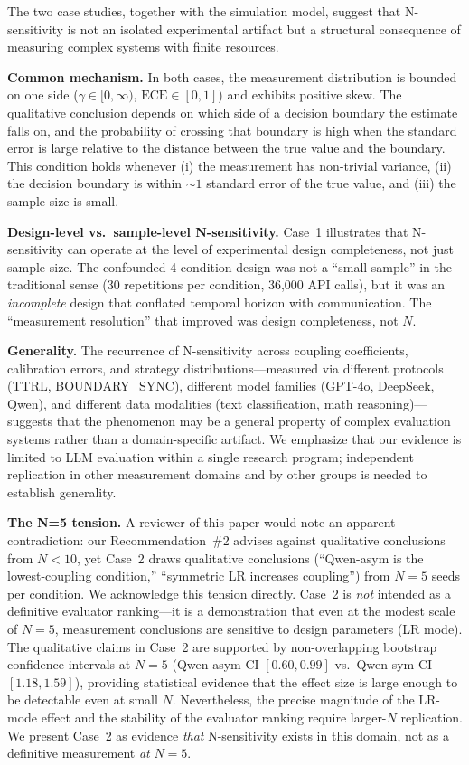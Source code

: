 \documentclass[11pt]{article}
\begin{document}
The two case studies, together with the simulation model, suggest that N-sensitivity is not an isolated experimental artifact but a structural consequence of measuring complex systems with finite resources.

\textbf{Common mechanism.} In both cases, the measurement distribution is bounded on one side ($\gamma \in [0, \infty)$, $\text{ECE} \in [0, 1]$) and exhibits positive skew. The qualitative conclusion depends on which side of a decision boundary the estimate falls on, and the probability of crossing that boundary is high when the standard error is large relative to the distance between the true value and the boundary. This condition holds whenever (i) the measurement has non-trivial variance, (ii) the decision boundary is within $\sim 1$ standard error of the true value, and (iii) the sample size is small.

\textbf{Design-level vs.\ sample-level N-sensitivity.} Case~1 illustrates that N-sensitivity can operate at the level of experimental design completeness, not just sample size. The confounded 4-condition design was not a ``small sample'' in the traditional sense (30 repetitions per condition, 36,000 API calls), but it was an \emph{incomplete} design that conflated temporal horizon with communication. The ``measurement resolution'' that improved was design completeness, not $N$.

\textbf{Generality.} The recurrence of N-sensitivity across coupling coefficients, calibration errors, and strategy distributions---measured via different protocols (TTRL, BOUNDARY\_SYNC), different model families (GPT-4o, DeepSeek, Qwen), and different data modalities (text classification, math reasoning)---suggests that the phenomenon may be a general property of complex evaluation systems rather than a domain-specific artifact. We emphasize that our evidence is limited to LLM evaluation within a single research program; independent replication in other measurement domains and by other groups is needed to establish generality.

\textbf{The N{=}5 tension.} A reviewer of this paper would note an apparent contradiction: our Recommendation~\#2 advises against qualitative conclusions from $N{<}10$, yet Case~2 draws qualitative conclusions (``Qwen-asym is the lowest-coupling condition,'' ``symmetric LR increases coupling'') from $N{=}5$ seeds per condition. We acknowledge this tension directly. Case~2 is \emph{not} intended as a definitive evaluator ranking---it is a demonstration that even at the modest scale of $N{=}5$, measurement conclusions are sensitive to design parameters (LR mode). The qualitative claims in Case~2 are supported by non-overlapping bootstrap confidence intervals at $N{=}5$ (Qwen-asym CI $[0.60, 0.99]$ vs.\ Qwen-sym CI $[1.18, 1.59]$), providing statistical evidence that the effect size is large enough to be detectable even at small $N$. Nevertheless, the precise magnitude of the LR-mode effect and the stability of the evaluator ranking require larger-$N$ replication. We present Case~2 as evidence \emph{that} N-sensitivity exists in this domain, not as a definitive measurement \emph{at} $N{=}5$.
\end{document}
